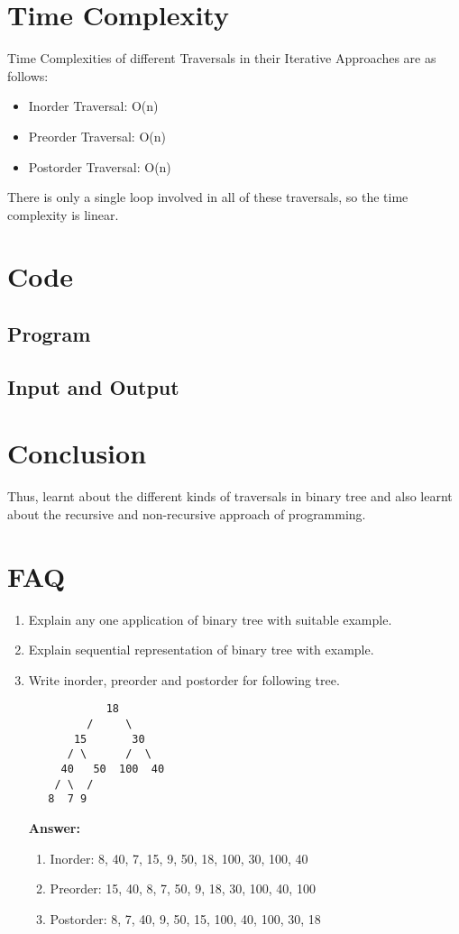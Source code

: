 \documentclass[11pt]{article}
\begin{document}
\section{Time Complexity}
Time Complexities of different Traversals in their Iterative Approaches are as follows:
\begin{itemize}
    \item Inorder Traversal: O(n)
    \item Preorder Traversal: O(n)
    \item Postorder Traversal: O(n)
\end{itemize}

There is only a single loop involved in all of these traversals, so the time complexity is linear.

\section{Code}

\subsection{Program}


\subsection{Input and Output}


\section{Conclusion}
Thus, learnt about the different kinds of traversals in binary tree and also learnt about the recursive and non-recursive approach of programming.

\clearpage

\section{FAQ}
\begin{enumerate}
    \item Explain any one application of binary tree with suitable example.
    \item Explain sequential representation of binary tree with example.
    \item Write inorder, preorder and postorder for following tree.
    \begin{verbatim}
            18
         /     \
       15       30
      / \      /  \
     40   50  100  40
    / \  /  
   8  7 9              
    \end{verbatim}
    \textbf{Answer:}
    \begin{enumerate}
        \item Inorder: 8, 40, 7, 15, 9, 50, 18, 100, 30, 100, 40
        \item Preorder:  15, 40, 8, 7, 50, 9, 18, 30, 100, 40, 100
        \item Postorder: 8, 7, 40, 9, 50, 15, 100, 40, 100, 30, 18
    \end{enumerate}

\end{enumerate}
\end{document}
